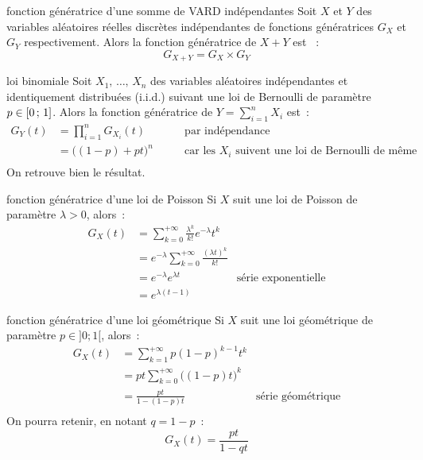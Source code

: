 \begin{proposition}{}{fonction génératrice d'une somme de VARD indépendantes}
    Soit $X$ et $Y$ des variables aléatoires réelles discrètes indépendantes de fonctions génératrices $G_X$ et $G_Y$ respectivement. Alors la fonction génératrice de $X + Y$ est ~:
    $$G_{X+Y} = G_X \times G_Y$$
    
\end{proposition}

\begin{exemple}{}{loi binomiale}
    Soit $X_1,\, \dots,\, X_n$ des variables aléatoires indépendantes et identiquement distribuées (i.i.d.) suivant une loi de Bernoulli de paramètre $p \in [0\, ; \, 1]$. Alors la fonction génératrice de $Y = \sum_{i=1}^n X_i$ est~:
    \begin{align*}
        G_Y(t) &= \prod_{i=1}^n G_{X_i}(t) \qquad &\text{par indépendance}\\
        &= \Big((1-p) + pt\Big)^n \qquad &\text{car les } X_i \text{ suivent une loi de Bernoulli de même paramètre}\\
    \end{align*}
    On retrouve bien le résultat.
\end{exemple}

\begin{exemple}{}{fonction génératrice d'une loi de Poisson}
    Si $X$ suit une loi de Poisson de paramètre $\lambda > 0$, alors~:
    \begin{align*}
        G_X(t) &= \sum_{k=0}^{+\infty} \frac{\lambda^k}{k!}e^{-\lambda} t^k \\
        &= e^{-\lambda} \sum_{k=0}^{+\infty} \frac{(\lambda t)^k}{k!} \\
        &= e^{-\lambda} e^{\lambda t} \qquad &\text{série exponentielle}\\
        &= e^{\lambda(t-1)}
    \end{align*}
\end{exemple}

\begin{exemple}{}{fonction génératrice d'une loi géométrique}
    Si $X$ suit une loi géométrique de paramètre $p \in ]0; 1[$, alors~:
    \begin{align*}
        G_X(t) &= \sum_{k=1}^{+\infty} p(1-p)^{k-1} t^k \\
        &= pt \sum_{k=0}^{+\infty} \Big((1-p)t\Big)^k \\
        &= \frac{pt}{1-(1-p)t} \qquad &\text{série géométrique}\\
    \end{align*}
    On pourra retenir, en notant $q = 1-p$~:
    $$G_X(t) = \frac{pt}{1-qt}$$
    
\end{exemple}

